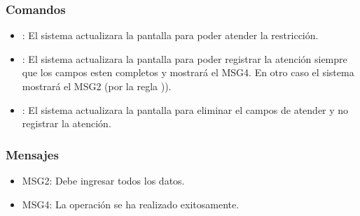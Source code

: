 \subsubsection{Comandos}
\begin{itemize}
 \item {}: El sistema actualizara la pantalla  para poder atender la restricción.
 \item {}: El sistema actualizara la pantalla  para poder registrar la atención siempre que los campos esten completos y mostrará el MSG4. En otro caso el sistema mostrará el MSG2 (por la regla )). 
 \item {}: El sistema actualizara la pantalla  para eliminar el campos de atender y no registrar la atención.
\end{itemize}

\subsubsection{Mensajes}
\begin{itemize}
  \item MSG2: Debe ingresar todos los datos.
  \item MSG4: La operación se ha realizado exitosamente.
\end{itemize}